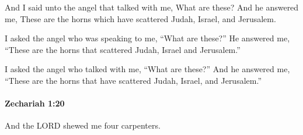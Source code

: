			\begin{versebox}
					\item[BHS] 
					\item[LXX] 
					\item[ASV] And I said unto the angel that talked with me, What are these? And he answered me, These are the horns which have scattered Judah, Israel, and Jerusalem.
					\item[NIV] I asked the angel who was speaking to me, “What are these?” He answered me, “These are the horns that scattered Judah, Israel and Jerusalem.”
					\item[NRSV] I asked the angel who talked with me, “What are these?” And he answered me, “These are the horns that have scattered Judah, Israel, and Jerusalem.”
			\end{versebox}

		\paragraph{Zechariah 1:20} %
			\label{ZECHARIAH-1-20}

			And the LORD shewed me four carpenters.

